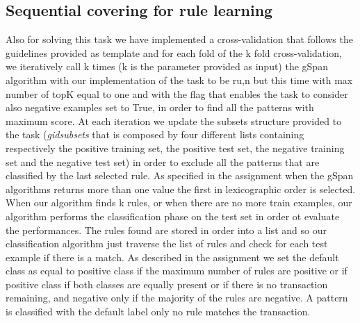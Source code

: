 \documentclass[11pt, a4paper]{article}
\begin{document}
		\subsection{Sequential covering for rule learning}
			Also for solving this task we have implemented a cross-validation that follows the guidelines provided as template and for each fold of the k fold cross-validation, we iteratively call k times (k is the parameter provided as input) the gSpan algorithm with our implementation of the task to be ru,n but this time with max number of topK equal to one and with the flag that enables the task to consider also negative examples set to True, in order to find all the patterns with maximum score. At each iteration we update the subsets structure provided to the task (\textit{\textit{gid\textunderscore subsets}} that is composed by four different lists containing respectively the positive training set, the positive test set, the negative training set and the negative test set) in order to exclude all the patterns that are classified by the last selected rule. As specified in the assignment when the gSpan algorithms returns more than one value the first in lexicographic order is selected.
			When our algorithm finds k rules, or when there are no more train examples, our algorithm performs the classification phase on the test set in order ot evaluate the performances. The rules found are stored in order into a list and so our classification algorithm just traverse the list of rules and check for each test example if there is a match. As described in the assignment we set the default class as equal to positive class if the maximum number of rules are positive or if positive class if both classes are equally present or if there is no transaction remaining, and negative only if the majority of the rules are negative. A pattern is classified with the default label only no rule matches the transaction.
\end{document}

